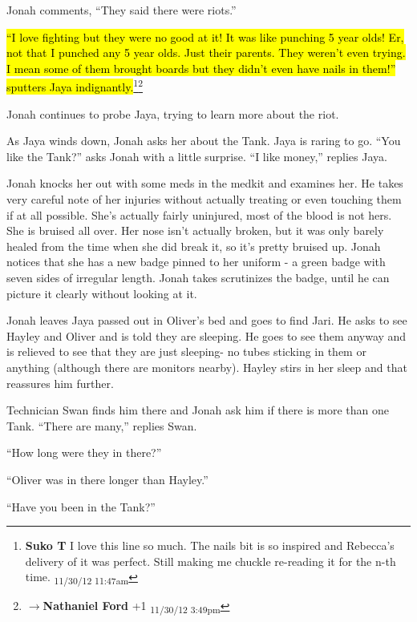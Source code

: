 Jonah comments, ``They said there were riots.''

\hl{``I love fighting but they were no good at it!  It was like punching 5 year olds!  Er, not that I punched any 5 year olds.  Just their parents.  They weren't even trying. I mean some of them brought boards but they didn't even have nails in them!'' sputters Jaya indignantly.}\footnote{\textbf{Suko T }I love this line so much. The nails bit is so inspired and  Rebecca's delivery of it was  perfect.  Still making me chuckle re-reading it for the n-th time. \textsubscript{11/30/12 11:47am}}\footnote{$\rightarrow$\textbf{Nathaniel Ford }+1 \textsubscript{11/30/12 3:49pm}}

Jonah continues to probe Jaya, trying to learn more about the riot.



As Jaya winds down, Jonah asks her about the Tank.  Jaya is raring to go. ``You like the Tank?'' asks Jonah with a little surprise. ``I like money,'' replies Jaya.



Jonah knocks her out with some meds in the medkit and examines her.  He takes very careful note of her injuries without actually treating or even touching them if at all possible.  She's actually fairly uninjured, most of the blood is not hers.  She is bruised all over.  Her nose isn't actually broken, but it was only barely healed from the time when she did break it, so it's pretty bruised up.  Jonah notices that she has a new badge pinned to her uniform - a green badge with seven sides of irregular length.  Jonah takes scrutinizes the badge, until he can picture it clearly without looking at it.



Jonah leaves Jaya passed out in Oliver's bed and goes to find Jari.  He asks to see Hayley and Oliver and is told they are sleeping.  He goes to see them anyway and is relieved to see that they are just sleeping- no tubes sticking in them or anything (although there are monitors nearby).  Hayley stirs in her sleep and that reassures him further.



Technician Swan finds him there and Jonah ask him if there is more than one Tank.  ``There are many,'' replies Swan.

``How long were they in there?''

``Oliver was in there longer than Hayley.''

``Have you been in the Tank?''

